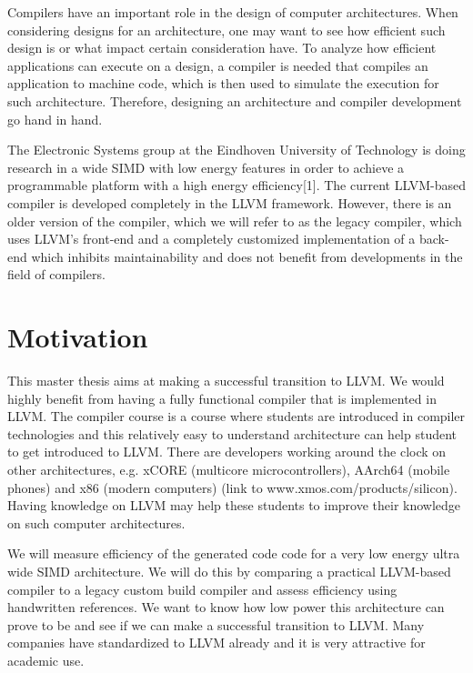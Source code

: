 Compilers have an important role in the design of computer architectures. When considering designs for an architecture, one may want to see how efficient such design is or what impact certain consideration have. To analyze how efficient applications can execute on a design, a compiler is needed that compiles an application to machine code, which is then used to simulate the execution for such architecture. Therefore, designing an architecture and compiler development go hand in hand.  

The Electronic Systems group at the Eindhoven University of Technology is doing research in a wide SIMD with low energy features in order to achieve a programmable platform with a high energy efficiency[1]. The current LLVM-based compiler is developed completely in the LLVM framework. However, there is an older version of the compiler, which we will refer to as the legacy compiler, which uses LLVM's front-end and a completely customized implementation of a back-end which inhibits maintainability and does not benefit from developments in the field of compilers.

\newpage \section{Motivation}
This master thesis aims at making a successful transition to LLVM. We would highly benefit from having a fully functional compiler that is implemented in LLVM. The compiler course is a course where students are introduced in compiler technologies and this relatively easy to understand architecture can help student to get introduced to LLVM. There are developers working around the clock on other architectures, e.g. xCORE (multicore microcontrollers), AArch64 (mobile phones) and x86 (modern computers) (link to www.xmos.com/products/silicon). Having knowledge on LLVM may help these students to improve their knowledge on such computer architectures.  

We will measure efficiency of the generated code code for a very low energy ultra wide SIMD architecture. We will do this by comparing a practical LLVM-based compiler to a legacy custom build compiler and assess efficiency using handwritten references. We want to know how low power this architecture can prove to be and see if we can make a successful transition to LLVM. Many companies have standardized to LLVM already and it is very attractive for academic use. %

